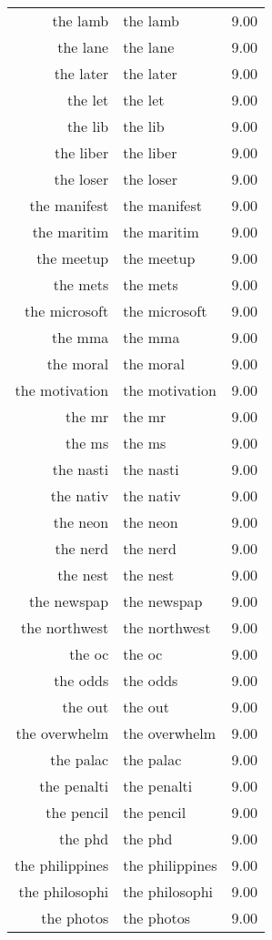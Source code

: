 \begin{table}[ht]
\begin{tabular}{rlr}
  the lamb & the lamb & 9.00 \\ 
  the lane & the lane & 9.00 \\ 
  the later & the later & 9.00 \\ 
  the let & the let & 9.00 \\ 
  the lib & the lib & 9.00 \\ 
  the liber & the liber & 9.00 \\ 
  the loser & the loser & 9.00 \\ 
  the manifest & the manifest & 9.00 \\ 
  the maritim & the maritim & 9.00 \\ 
  the meetup & the meetup & 9.00 \\ 
  the mets & the mets & 9.00 \\ 
  the microsoft & the microsoft & 9.00 \\ 
  the mma & the mma & 9.00 \\ 
  the moral & the moral & 9.00 \\ 
  the motivation & the motivation & 9.00 \\ 
  the mr & the mr & 9.00 \\ 
  the ms & the ms & 9.00 \\ 
  the nasti & the nasti & 9.00 \\ 
  the nativ & the nativ & 9.00 \\ 
  the neon & the neon & 9.00 \\ 
  the nerd & the nerd & 9.00 \\ 
  the nest & the nest & 9.00 \\ 
  the newspap & the newspap & 9.00 \\ 
  the northwest & the northwest & 9.00 \\ 
  the oc & the oc & 9.00 \\ 
  the odds & the odds & 9.00 \\ 
  the out & the out & 9.00 \\ 
  the overwhelm & the overwhelm & 9.00 \\ 
  the palac & the palac & 9.00 \\ 
  the penalti & the penalti & 9.00 \\ 
  the pencil & the pencil & 9.00 \\ 
  the phd & the phd & 9.00 \\ 
  the philippines & the philippines & 9.00 \\ 
  the philosophi & the philosophi & 9.00 \\ 
  the photos & the photos & 9.00 \\ 

\end{tabular}
\end{table}
